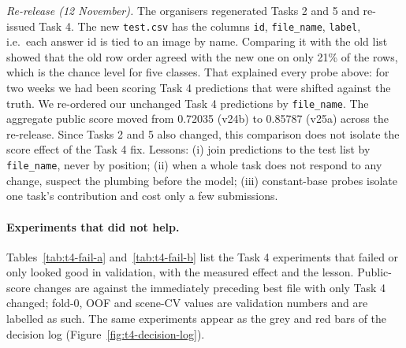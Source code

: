 \documentclass[../main.tex]{subfiles}
\begin{document}
\emph{Re-release (12 November).} The organisers regenerated Tasks 2 and 5 and re-issued Task 4. The new \texttt{test.csv} has the columns \texttt{id}, \texttt{file\_name}, \texttt{label}, i.e.\ each answer id is tied to an image by name. Comparing it with the old list showed that the old row order agreed with the new one on only 21\% of the rows, which is the chance level for five classes. That explained every probe above: for two weeks we had been scoring Task 4 predictions that were shifted against the truth. We re-ordered our unchanged Task 4 predictions by \texttt{file\_name}. The aggregate public score moved from 0.72035 (v24b) to 0.85787 (v25a) across the re-release. Since Tasks 2 and 5 also changed, this comparison does not isolate the score effect of the Task 4 fix. Lessons: (i) join predictions to the test list by \texttt{file\_name}, never by position; (ii) when a whole task does not respond to any change, suspect the plumbing before the model; (iii) constant-base probes isolate one task's contribution and cost only a few submissions.

\paragraph{Experiments that did not help.} Tables~\ref{tab:t4-fail-a} and~\ref{tab:t4-fail-b} list the Task 4 experiments that failed or only looked good in validation, with the measured effect and the lesson. Public-score changes are against the immediately preceding best file with only Task 4 changed; fold-0, OOF and scene-CV values are validation numbers and are labelled as such. The same experiments appear as the grey and red bars of the decision log (Figure~\ref{fig:t4-decision-log}).
\end{document}
